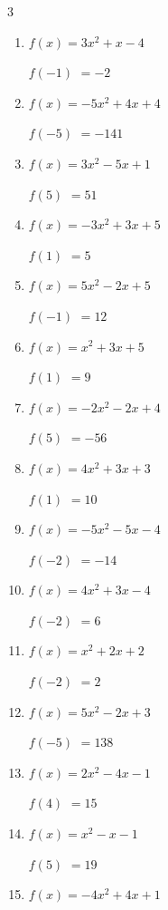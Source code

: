 \begin{multicols}{3}
\begin{enumerate}
$f(-2)$
        $= 4$

\columnbreak %

  \item $f(x)=3x^{2}+x-4$

$f(-1)$
        $= -2$

  \item $f(x)=-5x^{2}+4x+4$

$f(-5)$
        $= -141$

  \item $f(x)=3x^{2}-5x+1$

$f(5)$
        $= 51$

  \item $f(x)=-3x^{2}+3x+5$

$f(1)$
        $= 5$

  \item $f(x)=5x^{2}-2x+5$

$f(-1)$
        $= 12$

  \item $f(x)=x^{2}+3x+5$

$f(1)$
        $= 9$

  \item $f(x)=-2x^{2}-2x+4$

$f(5)$
        $= -56$

  \item $f(x)=4x^{2}+3x+3$

$f(1)$
        $= 10$

  \item $f(x)=-5x^{2}-5x-4$

$f(-2)$
        $= -14$

  \item $f(x)=4x^{2}+3x-4$

$f(-2)$
        $= 6$

  \item $f(x)=x^{2}+2x+2$

$f(-2)$
        $= 2$

  \item $f(x)=5x^{2}-2x+3$

$f(-5)$
        $= 138$

  \item $f(x)=2x^{2}-4x-1$

$f(4)$
        $= 15$

  \item $f(x)=x^{2}-x-1$

$f(5)$
        $= 19$

  \item $f(x)=-4x^{2}+4x+1$


\end{enumerate}
\end{multicols}
